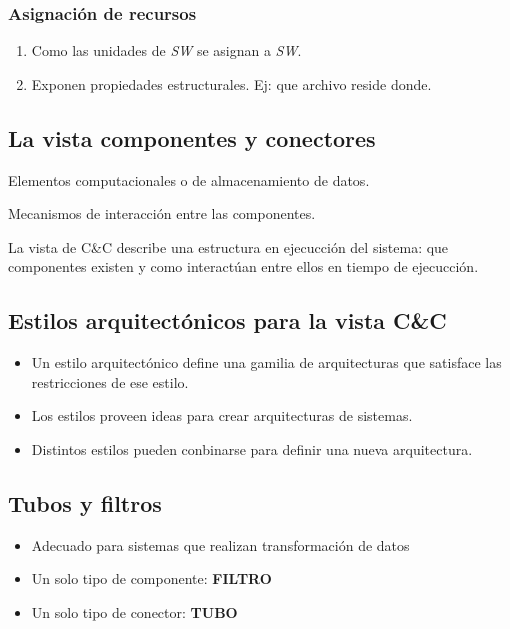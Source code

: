     \subsubsection{Asignación de recursos}
      \begin{enumerate}[-]
        \item Como las unidades de \textit{SW} se asignan a \textit{SW}.
        \item Exponen propiedades estructurales. Ej: que archivo reside donde.
      \end{enumerate}

  \subsection{La vista componentes y conectores}
    
    \PN{} Elementos computacionales o de almacenamiento de datos.

    \PN{} Mecanismos de interacción entre las componentes.

    \PN La vista de C\&C describe una estructura en ejecucción del sistema: que componentes existen y como interactúan
    entre ellos en tiempo de ejecucción.

  \subsection{Estilos arquitectónicos para la vista C\&C}

    \begin{itemize}
      \setlength\itemsep{0mm}
      \item Un estilo arquitectónico define una gamilia de arquitecturas que satisface las restricciones de ese estilo.
      \item Los estilos proveen ideas para crear arquitecturas de sistemas.
      \item Distintos estilos pueden conbinarse para definir una nueva arquitectura.
    \end{itemize}

  \subsection{Tubos y filtros}

    \begin{itemize}
      \setlength\itemsep{0mm}
      \item Adecuado para sistemas que realizan transformación de datos
      \item Un solo tipo de componente: \textbf{FILTRO}
      \item Un solo tipo de conector: \textbf{TUBO}
    \end{itemize}

